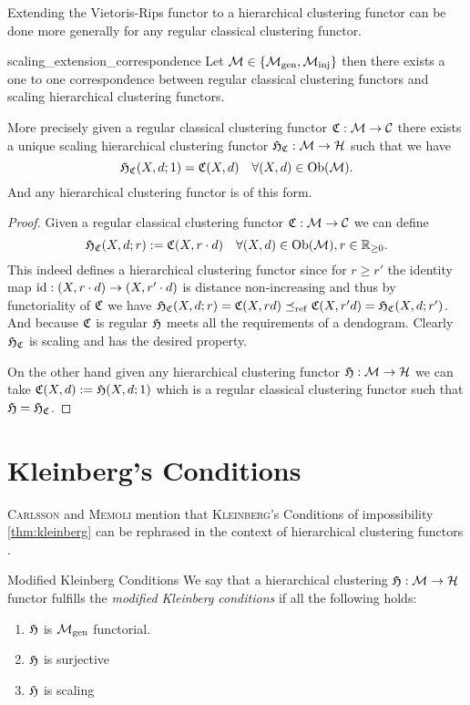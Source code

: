 Extending the Vietoris-Rips functor to a hierarchical clustering functor can be done more generally for any regular classical clustering functor.
\begin{proposition}{}{scaling_extension_correspondence}
Let $\mathcal{M} \in \{{\mathcal{M}_\mathrm{gen}},{\mathcal{M}_\mathrm{inj}}\}$ then there exists a one to one correspondence between regular classical clustering functors and scaling hierarchical clustering functors.

\medskip
More precisely given a regular classical clustering functor $\mathfrak{C}: \mathcal{M} \to \mathcal{C}$ there exists a unique scaling hierarchical clustering functor $\mathfrak{H}_{\mathfrak{C}}: \mathcal{M} \to \mathcal{H}$ such that we have
$$
\mathfrak{H}_{\mathfrak{C}}(X,d; 1) = \mathfrak{C}(X,d) \quad \forall (X,d) \in \mathrm {Ob}(\mathcal{M}).
$$
And any hierarchical clustering functor is of this form.
\end{proposition}

\begin{proof}
Given a regular classical clustering functor $\mathfrak{C}: \mathcal{M} \to \mathcal{C}$ we can define
$$
\mathfrak{H}_{\mathfrak{C}}(X,d; r) := \mathfrak{C}(X, r \cdot d) \quad \forall (X,d) \in \mathrm {Ob}(\mathcal{M}), r \in \mathbb R_{\geq0}.
$$
This indeed defines a hierarchical clustering functor since for $r \geq r'$ the identity map $\mathrm{id}: (X, r \cdot d) \to (X, r' \cdot d)$ is distance non-increasing and thus by functoriality of $\mathfrak{C}$ we have $\mathfrak{H}_{\mathfrak{C}}(X,d;r) = \mathfrak{C}(X, r d) \preceq_\mathrm{ref} \mathfrak{C}(X, r' d) = \mathfrak{H}_{\mathfrak{C}}(X,d;r')$. And because $\mathfrak{C}$ is regular $\mathfrak{H}$ meets all the requirements of a dendogram.  Clearly $\mathfrak{H}_{\mathfrak{C}}$ is scaling and has the desired property.

On the other hand given any hierarchical clustering functor $\mathfrak{H}: \mathcal{M} \to \mathcal{H}$ we can take $\mathfrak{C}(X,d) := \mathfrak{H}(X,d; 1)$ which is a regular classical clustering functor such that $\mathfrak{H} = \mathfrak{H}_{\mathfrak{C}}$.
\end{proof}

\section{Kleinberg's Conditions}

\textsc{Carlsson} and \textsc{Memoli} mention that \textsc{Kleinberg}'s Conditions of impossibility \ref{thm:kleinberg} can be rephrased in the context of hierarchical clustering functors 
\cite[Comment~7.3.1]{Carlsson2010}.

\begin{definition}{Modified Kleinberg Conditions}{}
    We say that a hierarchical clustering $\mathfrak{H}: \mathcal{M} \to \mathcal{H}$ functor fulfills the \emph{modified Kleinberg conditions} if all the following holds:
    \begin{enumerate}
        \item $\mathfrak{H}$ is ${\mathcal{M}_\mathrm{gen}}$ functorial.
        \item $\mathfrak{H}$ is surjective
        \item $\mathfrak{H}$ is scaling
    \end{enumerate}
\end{definition}


